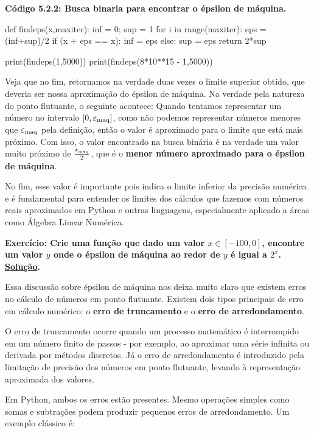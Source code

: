 \documentclass[11pt, a4paper]{article}
\begin{document}
\textbf{Código 5.2.2: Busca binaria para encontrar o épsilon de máquina.}

\begin{code}
def findeps(x,maxiter):
    inf = 0; sup = 1
    for i in range(maxiter):
        eps = (inf+sup)/2
        if (x + eps == x):
            inf = eps
        else:
            sup = eps
    return 2*sup

print(findeps(1,5000))
print(findeps(8*10**15 - 1,5000))
\end{code}

Veja que no fim, retornamos na verdade duas vezes o limite superior obtido, que deveria ser nossa aproximação do épsilon de máquina. Na verdade pela natureza do ponto flutuante, o seguinte acontece: Quando tentamos representar um número no intervalo \([0,\varepsilon_{\text{maq}}]\), como não podemos representar números menores que \(\varepsilon_{\text{maq}}\) pela definição, então o valor é aproximado para o limite que está mais próximo. Com isso, o valor encontrado na busca binária é na verdade um valor muito próximo de \(\frac{\varepsilon_{\text{maq}}}{2}\), que é o \textbf{menor número aproximado para o épsilon de máquina}.  

No fim, esse valor é importante pois indica o limite inferior da precisão numérica e é fundamental para entender os limites dos cálculos que fazemos com números reais aproximados em Python e outras linguagens, especialmente aplicado a áreas como Álgebra Linear Numérica.

\label{ex5.2.a}
\textbf{Exercício: Crie uma função que dado um valor \(x \in [-100,0]\), encontre um valor \(y\) onde o épsilon de máquina ao redor de \(y\) é igual a \(2^{x}\). \hyperref[sol_ex5.2.a]{Solução}.}

Essa discussão sobre épsilon de máquina nos deixa muito claro que existem erros no cálculo de números em ponto flutuante. Existem dois tipos principais de erro em cálculo numérico: o \textbf{erro de truncamento} e o \textbf{erro de arredondamento}.

O erro de truncamento ocorre quando um processo matemático é interrompido em um número finito de passos - por exemplo, ao aproximar uma série infinita ou derivada por métodos discretos. Já o erro de arredondamento é introduzido pela limitação de precisão dos números em ponto flutuante, levando à representação aproximada dos valores.

Em Python, ambos os erros estão presentes. Mesmo operações simples como somas e subtrações podem produzir pequenos erros de arredondamento. Um exemplo clássico é:
\end{document}
